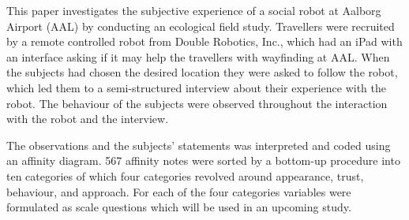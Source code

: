 \label{Abstract}
This paper investigates the subjective experience of a social robot at Aalborg Airport (AAL) by conducting an ecological field study. Travellers were recruited by a remote controlled robot from Double Robotics, Inc., which had an iPad with an interface asking if it may help the travellers with wayfinding at AAL. When the subjects had chosen the desired location they were asked to follow the robot, which led them to a semi-structured interview about their experience with the robot. The behaviour of the subjects were observed throughout the interaction with the robot and the interview. 

The observations and the subjects' statements was interpreted and coded using an affinity diagram. 567 affinity notes were sorted by a bottom-up procedure into ten categories of which four categories revolved around appearance, trust, behaviour,  and approach. For each of the four categories variables were formulated as scale questions which will be used in an upcoming study. 

